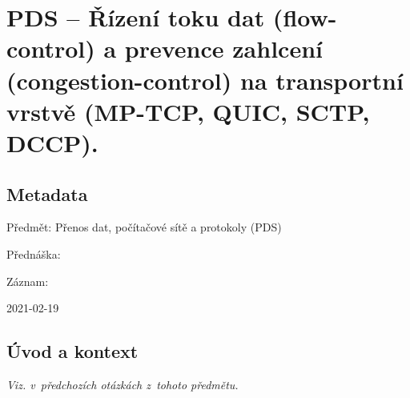 

\graphicspath{{pds/rizeni_toku_a_prevence_zahlceni}}


\chapter{PDS -- Řízení toku dat (flow-control) a prevence zahlcení (congestion-control) na transportní vrstvě (MP-TCP, QUIC, SCTP, DCCP).}


\section{Metadata}

\begin{compactitem}
    \item Předmět: Přenos dat, počítačové sítě a protokoly (PDS)
    \item Přednáška:
    \begin{compactitem}
        \item {}
    \end{compactitem}
    \item Záznam:
    \begin{compactitem}
        \item 2021-02-19
    \end{compactitem}
\end{compactitem}


\section{Úvod a kontext}

\textit{Viz.  v~předchozích otázkách z~tohoto předmětu.}

